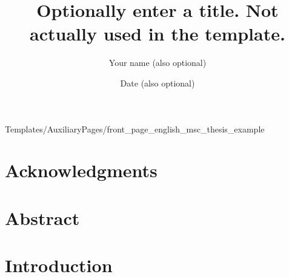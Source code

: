 \documentclass[a4paper,12pt,twoside]{book}
\title{Optionally enter a title. Not actually used in the template.}
\author{Your name (also optional)}
\date{Date (also optional)}
\begin{document}
\frontmatter
\pagestyle{empty}

        {Templates/AuxiliaryPages/front_page_english_msc_thesis_example}


\chapter*{Acknowledgments}
    \thispagestyle{empty}

\pagestyle{fancy}
\fancyhf{} %
\fancyhead[LE]{\nouppercase{\leftmark}}  %
\fancyhead[RO]{\nouppercase{\rightmark}}  %

\renewcommand{\headrulewidth}{0.4pt}  %


\chapter*{Abstract}
    \setcounter{page}{1}

    \tableofcontents
\clearpage

    \listoffigures
\clearpage



\mainmatter
\chapter{Introduction}
\label{sec_intro}
\end{document}
